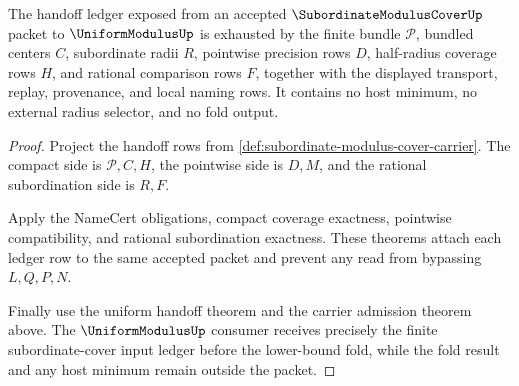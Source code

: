 \begin{theorem}
\label{thm:subordinate-modulus-cover-ledger-exactness}
The handoff ledger exposed from an accepted $\SubordinateModulusCoverUp$ packet to $\UniformModulusUp$ is exhausted by the finite bundle $\mathcal{P}$, bundled centers $C$, subordinate radii $R$, pointwise precision rows $D$, half-radius coverage rows $H$, and rational comparison rows $F$, together with the displayed transport, replay, provenance, and local naming rows. It contains no host minimum, no external radius selector, and no fold output.
\end{theorem}
\begin{proof}
Project the handoff rows from \autoref{def:subordinate-modulus-cover-carrier}. The compact side is $\mathcal{P},C,H$, the pointwise side is $D,M$, and the rational subordination side is $R,F$.

Apply the NameCert obligations, compact coverage exactness, pointwise compatibility, and rational subordination exactness. These theorems attach each ledger row to the same accepted packet and prevent any read from bypassing $L,Q,P,N$.

Finally use the uniform handoff theorem and the carrier admission theorem above. The $\UniformModulusUp$ consumer receives precisely the finite subordinate-cover input ledger before the lower-bound fold, while the fold result and any host minimum remain outside the packet.
\end{proof}

